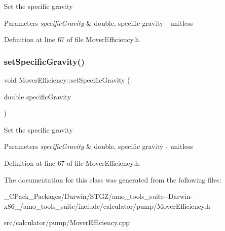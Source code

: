 Set the specific gravity 
\begin{DoxyParams}{Parameters}
{\em specific\+Gravity} & double, specific gravity -\/ unitless \\
\hline
\end{DoxyParams}


Definition at line 67 of file Mover\+Efficiency.\+h.

\mbox{\label{class_mover_efficiency_aed095f525636345bdfebe76774afa2d4}} 
\subsubsection{\texorpdfstring{set\+Specific\+Gravity()}{setSpecificGravity()}\hspace{0.1cm}{\footnotesize\ttfamily [3/3]}}
{\footnotesize\ttfamily void Mover\+Efficiency\+::set\+Specific\+Gravity (\begin{DoxyParamCaption}\item[{double}]{specific\+Gravity }\end{DoxyParamCaption})\hspace{0.3cm}{\ttfamily [inline]}}

Set the specific gravity 
\begin{DoxyParams}{Parameters}
{\em specific\+Gravity} & double, specific gravity -\/ unitless \\
\hline
\end{DoxyParams}


Definition at line 67 of file Mover\+Efficiency.\+h.



The documentation for this class was generated from the following files\+:\begin{DoxyCompactItemize}
\item 
\+\_\+\+C\+Pack\+\_\+\+Packages/\+Darwin/\+S\+T\+G\+Z/amo\+\_\+tools\+\_\+suite-\/-\/\+Darwin-\/x86\+\_/amo\+\_\+tools\+\_\+suite/include/calculator/pump/Mover\+Efficiency.\+h\item 
src/calculator/pump/Mover\+Efficiency.\+cpp\end{DoxyCompactItemize}
